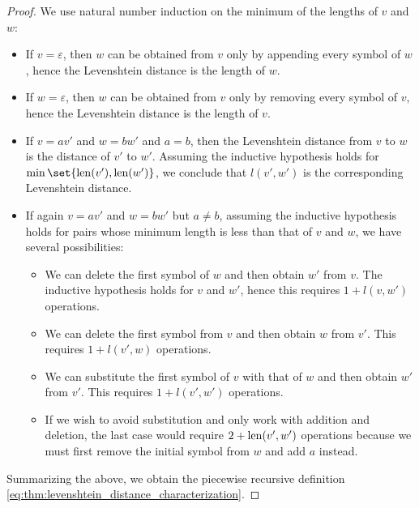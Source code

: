 \begin{proof}
  We use natural number induction on the minimum of the lengths of \( v \) and \( w \):
  \begin{itemize}
    \item If \( v = \varepsilon \), then \( w \) can be obtained from \( v \) only by appending every symbol of \( w \), hence the Levenshtein distance is the length of \( w \).

    \item If \( w = \varepsilon \), then \( w \) can be obtained from \( v \) only by removing every symbol of \( v \), hence the Levenshtein distance is the length of \( v \).

    \item If \( v = av' \) and \( w = bw' \) and \( a = b \), then the Levenshtein distance from \( v \) to \( w \) is the distance of \( v' \) to \( w' \). Assuming the inductive hypothesis holds for \( \min\set{ \len(v'), \len(w') } \), we conclude that \( l(v', w') \) is the corresponding Levenshtein distance.

    \item If again \( v = av' \) and \( w = bw' \) but \( a \neq b \), assuming the inductive hypothesis holds for pairs whose minimum length is less than that of \( v \) and \( w \), we have several possibilities:
    \begin{itemize}
      \item We can delete the first symbol of \( w \) and then obtain \( w' \) from \( v \). The inductive hypothesis holds for \( v \) and \( w' \), hence this requires \( 1 + l(v, w') \) operations.

      \item We can delete the first symbol from \( v \) and then obtain \( w \) from \( v' \). This requires \( 1 + l(v', w) \) operations.

      \item We can substitute the first symbol of \( v \) with that of \( w \) and then obtain \( w' \) from \( v' \). This requires \( 1 + l(v', w') \) operations.

      \item If we wish to avoid substitution and only work with addition and deletion, the last case would require \( 2 + \operatorname{len}(v', w') \) operations because we must first remove the initial symbol from \( w \) and add \( a \) instead.
    \end{itemize}
  \end{itemize}

  Summarizing the above, we obtain the piecewise recursive definition \eqref{eq:thm:levenshtein_distance_characterization}.
\end{proof}

